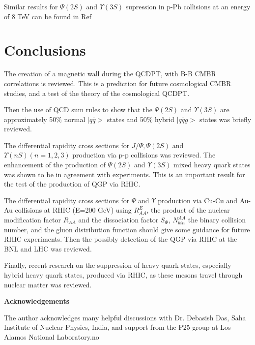  Similar results for $\Psi(2S)$ and $\Upsilon(3S)$ supression in p-Pb
collisions at an energy of 8 TeV can be found in Ref\cite{kdz16}

\section{Conclusions}

   The creation of a magnetic wall during the QCDPT, with B-B CMBR 
correlations is reviewed. This is a prediction for future cosmological
CMBR studies, and a test of the theory of the cosmological QCDPT. 

Then the use of QCD sum rules to show that the $\Psi(2S)$ and $\Upsilon(3S)$
are approximately 50\% normal $|q\bar{q}>$ states and 50\% hybrid  
$|q\bar{q}g>$ states was briefly reviewed.  
 
   The differential rapidity cross sections for
$J/\Psi, \Psi(2S)$ and $\Upsilon(nS)(n=1,2,3)$ production via p-p
collisions was reviewed. The enhancement of the production of $\Psi(2S)$ and 
$\Upsilon(3S)$ mixed heavy quark states was shown to be in agreement with
experiments. This is an important result for the test of the production
of QGP via RHIC.

  The differential rapidity cross sections for $\Psi$ and  $\Upsilon$
production via Cu-Cu and Au-Au collisions at RHIC (E=200 GeV) using 
$R^E_{AA}$, the product of the nuclear modification factor $R_{AA}$ and the 
dissociation factor $S_{\Phi}$, $N^{AA}_{bin}$ the binary collision number, and 
the gluon distribution function should give some guidance for future RHIC 
experiments. Then the possibly detection of the QGP via RHIC at the BNL
and LHC was reviewed.

  Finally, recent research on the suppression of heavy quark states, especially 
hybrid heavy quark states, produced via RHIC, as these mesons travel through 
nuclear matter was reviewed.
\newpage

{\bf Acknowledgements}

\normalsize
\vspace{5mm}

 The author acknowledges many helpful discussions with Dr. Debasish Das,
Saha Institute of Nuclear Physics, India, and support from the P25 group at 
Los Alamos National Laboratory.no

